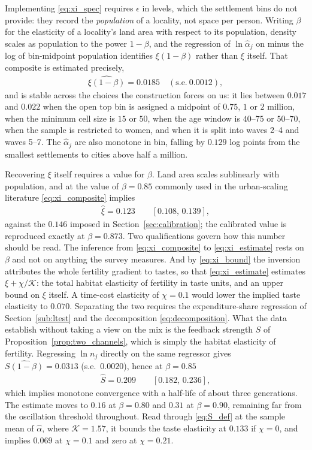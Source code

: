 \documentclass[11pt]{article}
\begin{document}
Implementing \eqref{eq:xi_spec} requires $\epsilon$ in levels, which the settlement bins do not
provide: they record the \emph{population} of a locality, not space per person. Writing
$\beta$ for the elasticity of a locality's land area with respect to its population, density scales
as population to the power $1-\beta$, and the regression of $\ln\hat\alpha_j$ on minus the log of
bin-midpoint population identifies $\xi(1-\beta)$ rather than $\xi$ itself. That composite is
estimated precisely,
\begin{align}
\widehat{\xi(1-\beta)}=0.0185\quad(\text{s.e.}\ 0.0012),
\label{eq:xi_composite}
\end{align}
and is stable across the choices the construction forces on us: it lies between $0.017$ and $0.022$
when the open top bin is assigned a midpoint of $0.75$, $1$ or $2$ million, when the minimum cell
size is $15$ or $50$, when the age window is $40$--$75$ or $50$--$70$, when the sample is restricted
to women, and when it is split into waves 2--4 and waves 5--7. The $\hat\alpha_j$ are also monotone
in bin, falling by $0.129$ log points from the smallest settlements to cities above half a million.

Recovering $\xi$ itself requires a value for $\beta$. Land area scales sublinearly with population,
and at the value of $\beta=0.85$ commonly used in the urban-scaling literature
\eqref{eq:xi_composite} implies
\begin{align}
\hat\xi=0.123\qquad[0.108,\,0.139],
\label{eq:xi_estimate}
\end{align}
against the $0.146$ imposed in Section~\ref{sec:calibration}; the calibrated value is reproduced
exactly at $\beta=0.873$. Two qualifications govern how this number should be read. The inference from
\eqref{eq:xi_composite} to \eqref{eq:xi_estimate} rests on $\beta$ and not on anything the survey
measures. And by \eqref{eq:xi_bound} the inversion attributes the whole fertility gradient to
tastes, so that \eqref{eq:xi_estimate} estimates $\xi+\chi/\mathcal{K}$: the total habitat
elasticity of fertility in taste units, and an upper bound on $\xi$ itself. A time-cost elasticity
of $\chi=0.1$ would lower the implied taste elasticity to $0.070$. Separating the two requires the
expenditure-share regression of Section~\ref{sub:ltest} and the decomposition
\eqref{eq:decomposition}. What the data establish without taking a view on the mix is the feedback strength $S$ of
Proposition~\ref{prop:two_channels}, which is simply the habitat elasticity of fertility.
Regressing $\ln n_j$ directly on the same regressor gives $\widehat{S(1-\beta)}=0.0313$
(s.e.\ $0.0020$), hence at $\beta=0.85$
\begin{align}
\hat S=0.209\qquad[0.182,\,0.236],
\label{eq:S_estimate}
\end{align}
which implies monotone convergence with a half-life of about three generations. The estimate moves
to $0.16$ at $\beta=0.80$ and $0.31$ at $\beta=0.90$, remaining far from the oscillation threshold
throughout. Read through \eqref{eq:S_def} at the sample mean of $\hat\alpha$, where
$\mathcal{K}=1.57$, it bounds the taste elasticity at $0.133$ if $\chi=0$, and implies $0.069$ at
$\chi=0.1$ and zero at $\chi=0.21$.
\end{document}
